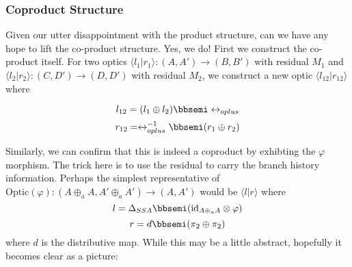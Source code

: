\documentclass[letterpaper, 10 pt, conference]{ieeeconf}  %
\begin{document}
\subsubsection{Coproduct Structure}

Given our utter disappointment with the product structure, can we have any
hope to lift the co-product structure. Yes, we do! First we construct the
co-product itself. For two optics $\langle l_1 | r_1 \rangle: (A, A') \to (B, B')$
with residual $M_1$ and $\langle l_2 | r_2 \rangle: (C, D') \to (D, D')$ with residual $M_2$,
we construct a new optic $\langle l_{12} | r_{12} \rangle$ where

\[
l_{12} = (l_1 \oplus l_2) \bbsemi \leftrightarrow_{oplus}
\]\[
r_{12} = \leftrightarrow_{oplus}^{-1} \bbsemi (r_1 \oplus r_2)
\]

Similarly, we can confirm that this is indeed a coproduct by exhibting the $\varphi$
morphism. The trick here is to use the
residual to carry the branch history information. Perhaps the simplest
representative of $\text{Optic}(\varphi): (A \oplus_a A, A' \oplus_a A') \to (A, A')$ would be $\langle l | r \rangle$ where
\[
l = \Delta_{SSA} \bbsemi (\text{id}_{A \oplus_a A} \otimes \varphi) \]\[
r = d \bbsemi (\pi_2 \oplus \pi_2)
\]
where $d$ is the distributive map. While this may be a little abstract, hopefully
it becomes clear as a picture:
\end{document}
